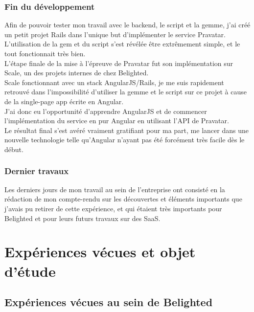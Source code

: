 \documentclass{report}
\begin{document}
    \subsection{Fin du développement}
    \label{sub:Fin du développement}

      Afin de pouvoir tester mon travail avec le backend, le script et la gemme, j'ai créé un petit projet Rails dans l'unique but d'implémenter le service Pravatar.\\
      L'utilisation de la gem et du script s'est révélée être extrêmement simple, et le tout fonctionnait très bien.\\

      L'étape finale de la mise à l'épreuve de Pravatar fut son implémentation sur Scale, un des projets internes de chez Belighted.\\
      Scale fonctionnant avec un stack AngularJS/Rails, je me suis rapidement retrouvé dans l'impossibilité d'utiliser la gemme et le script sur ce projet à cause de la single-page app écrite en Angular.\\
      J'ai donc eu l'opportunité d'apprendre AngularJS et de commencer l'implémentation du service en pur Angular en utilisant l'API de Pravatar.\\
      Le résultat final s'est avéré vraiment gratifiant pour ma part, me lancer dans une nouvelle technologie telle qu'Angular n'ayant pas été forcément très facile dès le début.\\

    \subsection{Dernier travaux}
    \label{sub:Dernier travaux}

      Les derniers jours de mon travail au sein de l'entreprise ont consisté en la rédaction de mon compte-rendu sur les découvertes et éléments importants que j'avais pu retirer de cette expérience,
      et qui étaient très importants pour Belighted et pour leurs futurs travaux sur des SaaS.


\chapter{Expériences vécues et objet d'étude}

  \section{Expériences vécues au sein de Belighted}
\end{document}

